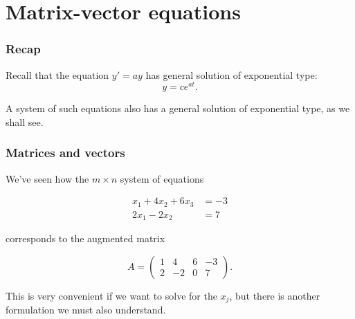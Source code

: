 \def\encoding{UTF-8}

\def\mytitle{Matrix-vector equations}
\def\affiliation{The College of Idaho}
\def\myauthor{Math 352 Differential Equations}
\def\mydate{3 May 2013}
\def\latexmode{beamer}

\def\htmlheaderlevel{2}
 \renewcommand{\vec}[1]{\mathbf{#1}} 

\section{Matrix-vector equations}
\label{matrix-vectorequations}

\begin{frame}

\frametitle{Recap}
\label{recap}

Recall that the equation $ y' = ay $ has general solution of exponential type:
\[
    y = ce^{at}.
\]

A system of such equations also has a general solution of exponential type, as we shall see.

\end{frame}

\begin{frame}

\frametitle{Matrices and vectors}
\label{matricesandvectors}

We've seen how the $ m \times n $ system of equations
 
    \begin{align*}
    x_1 + 4x_2 + 6x_3 &= -3\\
    2x_1 - 2x_2 \phantom{+ 0x_3} &= 7 
    \end{align*}

corresponds to the augmented matrix

\[
    A = \begin{pmatrix}
        1 & 4 & 6 & -3 \\
        2 & -2 & 0 & 7
    \end{pmatrix}.
\]

This is very convenient if we want to solve for the $ x_j $, but there is another formulation we must also understand.

\end{frame}


